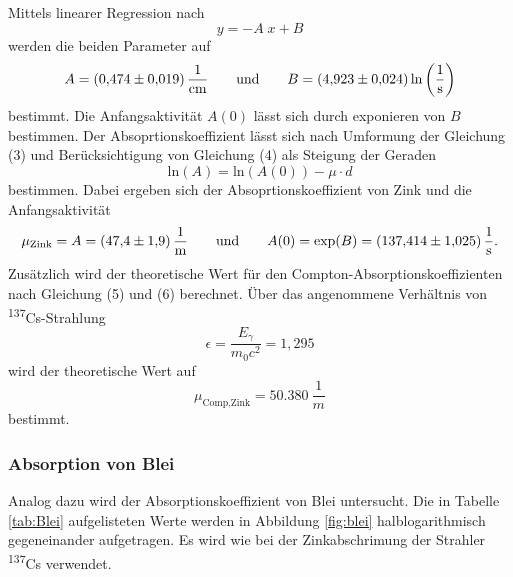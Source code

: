 Mittels linearer Regression nach
\begin{equation}
  \label{eq:lin}
  y = - A \;x + B
\end{equation}
werden die beiden Parameter auf 
\begin{equation}
  A = \SI{0.474 \pm 0.019}{\frac{1}{cm}} \qquad \text{und} \qquad B = \SI{4.923 \pm 0.024}{\text{ln}\left (\frac{1}{s}\right)}
\end{equation}
bestimmt.
Die Anfangsaktivität $A(0)$ lässt sich durch exponieren von $B$ bestimmen.
Der Absoprtionskoeffizient lässt sich nach Umformung der Gleichung (3) und Berücksichtigung von Gleichung (4) als Steigung der Geraden
\begin{equation}
  \text{ln}(A) = \text{ln}(A(0)) - \mu \cdot d
\end{equation}
bestimmen.
Dabei ergeben sich der Absoprtionskoeffizient von Zink und die Anfangsaktivität
\begin{equation}
  \mu_\text{Zink} = A = \SI{47.4 \pm 1.9}{\frac{1}{m}} \qquad \text{und} \qquad A(0) = \text{exp}(B) = \SI{137.414 \pm 1.025}{\frac{1}{s}}.   \notag
\end{equation}
Zusätzlich wird der theoretische Wert für den Compton-Absorptionskoeffizienten nach Gleichung (5) und (6) berechnet.
Über das angenommene Verhältnis von \textsuperscript{137}Cs-Strahlung
\begin{equation}
  \epsilon = \frac{E_\text{$\gamma$}}{m_0c^2} = 1,295
\end{equation}
wird der theoretische Wert auf
\begin{equation}
    \mu_\text{Comp,Zink} = \SI{50,380}{\frac{1}{m}}
\end{equation}
bestimmt.

\subsubsection{Absorption von Blei}
Analog dazu wird der Absorptionskoeffizient von Blei untersucht.
Die in Tabelle \ref{tab:Blei} aufgelisteten Werte werden in Abbildung \ref{fig:blei} halblogarithmisch gegeneinander aufgetragen.
Es wird wie bei der Zinkabschrimung der Strahler \textsuperscript{137}Cs verwendet.

